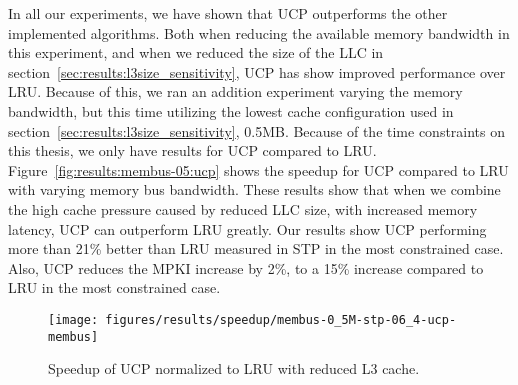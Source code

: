 In all our experiments, we have shown that UCP outperforms the other implemented algorithms.
Both when reducing the available memory bandwidth in this experiment, and when we reduced the size of the LLC in section~\ref{sec:results:l3size_sensitivity}, UCP has show improved performance over LRU.
Because of this, we ran an addition experiment varying the memory bandwidth, but this time utilizing the lowest cache configuration used in section~\ref{sec:results:l3size_sensitivity}, 0.5MB.
Because of the time constraints on this thesis, we only have results for UCP compared to LRU.
Figure~\ref{fig:results:membus-05:ucp} shows the speedup for UCP compared to LRU with varying memory bus bandwidth.
These results show that when we combine the high cache pressure caused by reduced LLC size, with increased memory latency, UCP can outperform LRU greatly.
Our results show UCP performing more than 21\% better than LRU measured in STP in the most constrained case.
Also, UCP reduces the MPKI increase by 2\%, to a 15\% increase compared to LRU in the most constrained case.

\begin{figure}[!htb]
    \centering
        \texttt{[image: figures/results/speedup/membus-0\_5M-stp-06\_4-ucp-membus]}
        \caption{Speedup of UCP normalized to LRU with reduced L3 cache.}
        \label{fig:results:bus-05:ucp}
\end{figure}